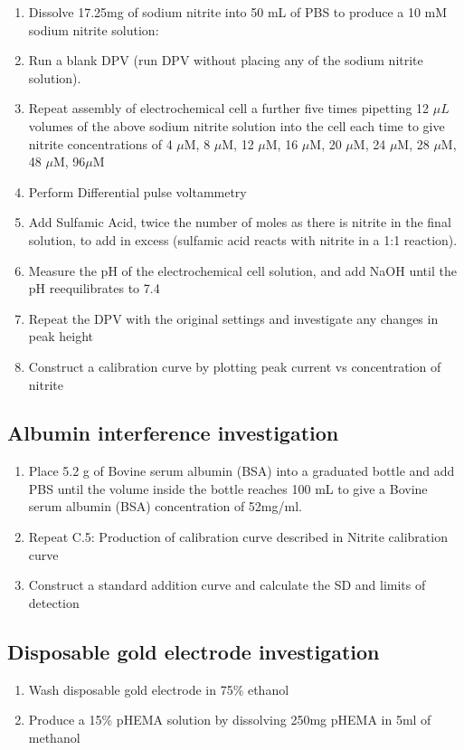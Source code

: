 \begin{appendices}
\begin{enumerate}
    \item Dissolve 17.25mg of sodium nitrite into 50 mL of PBS to produce a 10 mM sodium nitrite solution: 
    \item Run a blank DPV (run DPV without placing any of the sodium nitrite solution). 
    \item Repeat assembly of electrochemical cell a further five times pipetting 12 $\mu L$ volumes of the above sodium nitrite solution into the cell each time to give nitrite concentrations of 4 $\mu$M, 8 $\mu$M, 12 $\mu$M, 16 $\mu$M, 20 $\mu$M, 24 $\mu$M, 28 $\mu$M, 48 $\mu$M, 96$\mu$M 
    \item Perform Differential pulse voltammetry
    \item Add Sulfamic Acid, twice the number of moles as there is nitrite in the final solution, to add in excess (sulfamic acid reacts with nitrite in a 1:1 reaction).  
    \item Measure the pH of the electrochemical cell solution, and add NaOH until the pH reequilibrates to 7.4 
    \item Repeat the DPV with the original settings and investigate any changes in peak height 
    \item Construct a calibration curve by plotting peak current vs concentration of nitrite 
    
\end{enumerate}

\subsection{Albumin interference investigation}

\begin{enumerate}
    \item  Place 5.2 g of Bovine serum albumin (BSA) into a graduated bottle and add PBS until the volume inside the bottle reaches 100 mL to give a Bovine serum albumin (BSA) concentration of 52mg/ml. 
    \item Repeat C.5: Production of calibration curve described in Nitrite calibration curve 
    \item Construct a standard addition curve and calculate the SD and limits of detection 
    
\end{enumerate}
\subsection{Disposable gold electrode investigation}
\begin{enumerate}
    \item Wash disposable gold electrode in 75\% ethanol
    \item Produce a 15\% pHEMA solution by dissolving 250mg pHEMA in 5ml of methanol
    

\end{enumerate}
\end{appendices}
